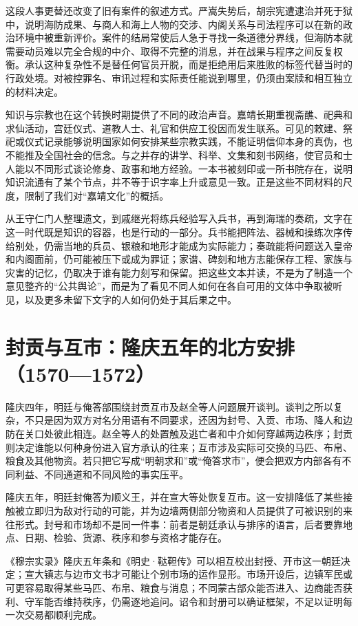 这段人事更替还改变了旧有案件的叙述方式。严嵩失势后，胡宗宪遭逮治并死于狱中，说明海防成果、与商人和海上人物的交涉、内阁关系与司法程序可以在新的政治环境中被重新评价。案件的结局常使后人急于寻找一条道德分界线，但海防本就需要动员难以完全合规的中介、取得不完整的消息，并在战果与程序之间反复权衡。承认这种复杂性不是替任何官员开脱，而是拒绝用后来胜败的标签代替当时的行政处境。对被控罪名、审讯过程和实际责任能说到哪里，仍须由案牍和相互独立的材料决定。

知识与宗教也在这个转换时期提供了不同的政治声音。嘉靖长期重视斋醮、祀典和求仙活动，宫廷仪式、道教人士、礼官和供应工役因而发生联系。可见的敕建、祭祀或仪式记录能够说明国家如何安排某些宗教实践，不能证明信仰本身的真伪，也不能推及全国社会的信念。与之并存的讲学、科举、文集和刻书网络，使官员和士人能以不同形式谈论修身、政事和地方经验。一本书被刻印或一所书院存在，说明知识流通有了某个节点，并不等于识字率上升或意见一致。正是这些不同材料的尺度，限制了我们对“嘉靖文化”的概括。

从王守仁门人整理遗文，到戚继光将练兵经验写入兵书，再到海瑞的奏疏，文字在这一时代既是知识的容器，也是行动的一部分。兵书能把阵法、器械和操练次序传给别处，仍需当地的兵员、银粮和地形才能成为实际能力；奏疏能将问题送入皇帝和内阁面前，仍可能被压下或成为罪证；家谱、碑刻和地方志能保存工程、家族与灾害的记忆，仍取决于谁有能力刻写和保留。把这些文本并读，不是为了制造一个意见整齐的“公共舆论”，而是为了看见不同人如何在各自可用的文体中争取被听见，以及更多未留下文字的人如何仍处于其后果之中。

\section{封贡与互市：隆庆五年的北方安排（1570—1572）}

隆庆四年，明廷与俺答部围绕封贡互市及赵全等人问题展开谈判。谈判之所以复杂，不只是因为双方对名分用语有不同要求，还因为封号、入贡、市场、降人和边防在关口处彼此相连。赵全等人的处置触及逃亡者和中介如何穿越两边秩序；封贡则决定谁能以何种身份进入官方承认的往来；互市涉及实际可交换的马匹、布帛、粮食及其他物资。若只把它写成“明朝求和”或“俺答求市”，便会把双方内部各有不同利益、不同通道和不同风险的事实压平。

\begin{event}
隆庆五年，明廷封俺答为顺义王，并在宣大等处恢复互市。这一安排降低了某些接触被立即归为敌对行动的可能，并为边墙两侧部分物资和人员提供了可被识别的来往形式。封号和市场却不是同一件事：前者是朝廷承认与排序的语言，后者要靠地点、日期、检验、货源、秩序和参与资格才能存在。

《穆宗实录》隆庆五年条和《明史·鞑靼传》可以相互校出封授、开市这一朝廷决定；宣大镇志与边市文书才可能让个别市场的运作显形。市场开设后，边镇军民或可更容易取得某些马匹、布帛、粮食与消息；不同蒙古部众能否进入、边商能否获利、守军能否维持秩序，仍需逐地追问。诏令和封册可以确证框架，不足以证明每一次交易都顺利完成。
\end{event}

